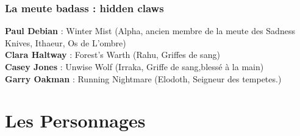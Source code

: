 \documentclass[oneside,12pt]{book}
\begin{document}
\begin{flushleft}
\subsection{La meute badass : hidden claws}
\label{hiddenclaws}
\textbf{Paul Debian} : Winter Mist (Alpha, ancien membre de la meute des Sadness Knives, Ithaeur, Os de L'ombre)\\
\textbf{Clara Haltway} : Forest’s Warth (Rahu, Griffes de sang) \\
\textbf{Casey Jones} : Unwise Wolf (Irraka, Griffe de sang,blessé à la main)\\
\textbf{Garry Oakman} : Running Nightmare (Elodoth, Seigneur des tempetes.) \\

\chapter{Les Personnages}
\clearpage

\end{flushleft}
\end{document}
